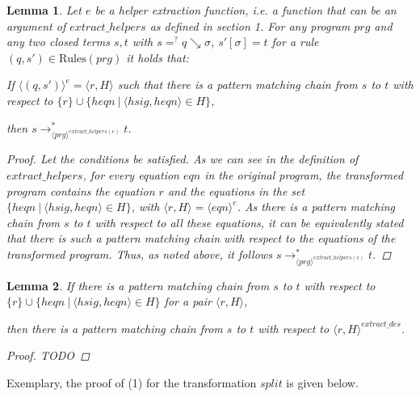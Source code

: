 \documentclass[11pt]{article} %
\newtheorem{lemma}{Lemma}
\begin{document}
\begin{lemma} Let $e$ be a helper extraction function, i.e. a function that can be an argument of $extract\_helpers$ as defined in section 1. For any program $prg$ and any two closed terms $s,t$ with $s =^? q \searrow \sigma$, $s'[\sigma] = t$ for a rule $(q, s') \in \textrm{Rules}(prg)$ it holds that:

If $\langle (q, s') \rangle^e = \big\langle r, H \big\rangle$ such that there is a pattern matching chain from $s$ to $t$ with respect to $\{ r \} \cup \{ heqn ~ | ~ \big\langle hsig, heqn \big\rangle \in H \}$,

then $s \longrightarrow_{\langle prg \rangle^{extract\_helpers(e)}}^* t$.

\begin{proof}

Let the conditions be satisfied. As we can see in the definition of $extract\_helpers$, for every equation $eqn$ in the original program, the transformed program contains the equation $r$ and the equations in the set $\{ heqn ~ | ~ \big\langle hsig, heqn \big\rangle \in H \}$, with $\big\langle r, H \big\rangle = \langle eqn \rangle^e$. As there is a pattern matching chain from $s$ to $t$ with respect to all these equations, it can be equivalently stated that there is such a pattern matching chain with respect to the equations of the transformed program. Thus, as noted above, it follows $s \longrightarrow_{\langle prg \rangle^{extract\_helpers(e)}}^* t$.

\end{proof}

\end{lemma}

\begin{lemma}

If there is a pattern matching chain from $s$ to $t$ with respect to $\{ r \} \cup \{ heqn ~ | ~ \big\langle hsig, heqn \big\rangle \in H \}$ for a pair $\big\langle r, H \big\rangle$,

then there is a pattern matching chain from $s$ to $t$ with respect to $\langle r, H \rangle^{extract\_des}$.

\begin{proof}

TODO

\end{proof}

\end{lemma}

Exemplary, the proof of (1) for the transformation $split$ is given below.
\end{document}
